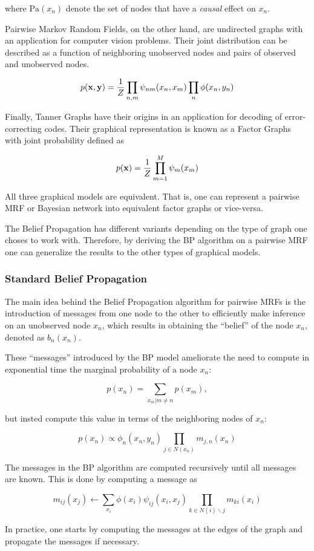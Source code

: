 \documentclass[11pt]{article}
\begin{document}
where $\text{Pa}(x_n)$ denote the set of nodes that have a \textit{causal} effect on $x_n$.

Pairwise Markov Random Fields, on the other hand, are undirected graphs with an application for computer vision problems. Their joint distribution can be described as a function of neighboring unobserved nodes and pairs of observed and unobserved nodes.

\begin{equation*}
	p({\bf x}, {\bf y}) = \frac{1}{Z}\prod_{n,m}\psi_{nm}(x_n, x_m)\prod_{n}\phi(x_n, y_n)
\end{equation*}

Finally, Tanner Graphs have their origins in an application for decoding of error-correcting codes. Their graphical representation is known as a Factor Graphs with joint probability defined as

\begin{equation*}
	p({\bf x}) = \frac{1}{Z}\prod_{m=1}^M \psi_m(x_m)
\end{equation*}

All three graphical models are equivalent. That is, one can represent a pairwise MRF or Bayesian network into equivalent factor graphs or vice-versa.

The Belief Propagation has different variants depending on the type of graph one choses to work with. Therefore, by deriving the BP algorithm on a pairwise MRF one can generalize the results to the other types of graphical models.

\subsubsection*{Standard Belief Propagation}
The main idea behind the Belief Propagation algorithm for pairwise MRFs is the introduction of messages from one node to the other to efficiently make inference on an unobserved node $x_n$, which results in obtaining the ``belief'' of the node $x_n$, denoted as $b_n(x_n)$.

These ``messages'' introduced by the BP model ameliorate the need to compute in exponential time the marginal probability of a node $x_n$:

\begin{equation*}
	p(x_n) = \sum_{x_m \vert m \neq n} p(x_m),
\end{equation*}

but insted compute this value in terms of the neighboring nodes of $x_n$:

\begin{equation*}
	p(x_n) \propto \phi_n(x_n, y_n) \prod_{j \in N(x_n)} m_{j,n}(x_n)
\end{equation*}

The messages in the BP algorithm are computed recursively until all messages are known. This is done by computing a message as

\begin{equation*}
	m_{ij}(x_j) \leftarrow \sum_{x_i} \phi(x_i) \psi_{ij}(x_i, x_j) \prod_{k \in N(i) \backslash j} m_{ki}(x_i)
\end{equation*}

In practice, one starts by computing the messages at the edges of the graph and propagate the messages if necessary.
\end{document}
